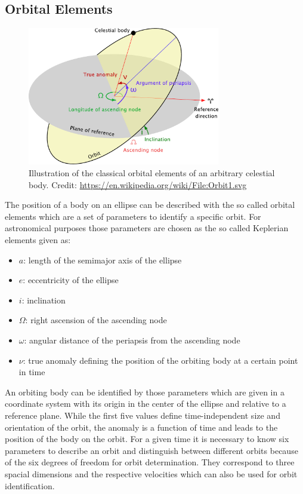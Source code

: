 \documentclass[11pt, a4paper]{article}
\numberwithin{equation}{section}
\begin{document}
\subsection{Orbital Elements}
\begin{figure}[h]
	\centering
	\includegraphics[width=0.75\textwidth]{./figures/orbital_elements.pdf}
	\caption{Illustration of the classical orbital elements of an arbitrary celestial body. Credit: \url{https://en.wikipedia.org/wiki/File:Orbit1.svg}}
\end{figure}
The position of a body on an ellipse can be described with the so called orbital elements which are a set of parameters to identify a specific orbit.
For astronomical purposes those parameters are chosen as the so called Keplerian elements given as:
\begin{itemize}
	\item $a$: length of the semimajor axis of the ellipse	
	\item $e$: eccentricity of the ellipse	
	\item $i$: inclination	
	\item $\Omega$: right ascension of the ascending node	
	\item $\omega$: angular distance of the periapsis from the ascending node	
	\item $\nu$: true anomaly defining the position of the orbiting body at a certain point in time
\end{itemize}
An orbiting body can be identified by those parameters which are given in a coordinate system with its origin in the center of the ellipse and relative to a reference plane.
While the first five values define time-independent size and orientation of the orbit, the anomaly is a function of time and leads to the position of the body on the orbit.
For a given time it is necessary to know six parameters to describe an orbit and distinguish between different orbits because of the six degrees of freedom for orbit determination.
They correspond to three spacial dimensions and the respective velocities which can also be used for orbit identification.
\end{document}
